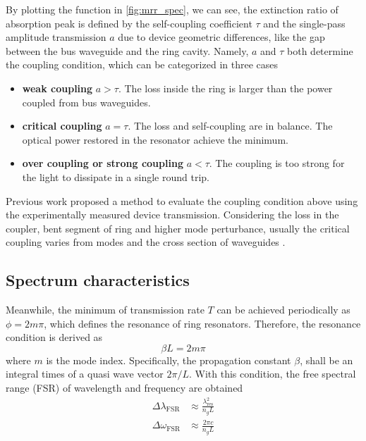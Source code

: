 By plotting the function in \autoref{fig:mrr_spec}, we can see, the extinction ratio of absorption peak is defined by the self-coupling coefficient $\tau$ and the single-pass amplitude transmission $a$ due to device geometric differences, like the gap between the bus waveguide and the ring cavity. Namely, $a$ and $\tau$ both determine the coupling condition, which can be categorized in three cases
\begin{itemize}
    \item \textbf{weak coupling} $a>\tau$. The loss inside the ring is larger than the power coupled from bus waveguides.
    \item \textbf{critical coupling} $a=\tau$. The loss and self-coupling are in balance. The optical power restored in the resonator achieve the minimum.
    \item \textbf{over coupling or strong coupling} $a<\tau$. The coupling is too strong for the light to dissipate in a single round trip.
\end{itemize}

Previous work \cite{Yusuke2017} proposed a method to evaluate the coupling condition above using the experimentally measured device transmission. Considering the loss in the coupler, bent segment of ring and higher mode perturbance, usually the critical coupling varies from modes and the cross section of waveguides \cite{Pfeiffer2017}.

\subsection{Spectrum characteristics}
Meanwhile, the minimum of transmission rate $T$ can be achieved periodically as $\phi=2 m \pi$, which defines the resonance of ring resonators. Therefore, the resonance condition is derived as
\begin{equation}\label{eq:res-con}
    \beta L =2 m \pi
\end{equation}
where $m$ is the mode index. Specifically, the propagation constant $\beta$, shall be an integral times of a quasi wave vector $2\pi/L$. With this condition, the free spectral range (FSR) of wavelength and frequency are obtained
\begin{align}
    \Delta \lambda_\mathrm{FSR} &\approx \frac{\lambda_\mathrm{res}^2}{n_g L} \label{eq:fsr-wl} \\
    \Delta \omega_\mathrm{FSR} &\approx \frac{2\pi c}{n_g L} \label{eq:fsr-w}
\end{align}

